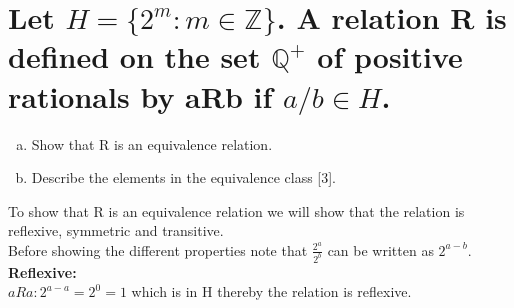 \newpage
\section{Let $H = \{2^m : m\in \mathbb{Z}\}$. A relation R is defined on the set $\mathbb{Q}^{+}$ of positive rationals by aRb if $a/b\in H$.}
\begin{enumerate}[a.]
\item Show that R is an equivalence relation.
\item Describe the elements in the equivalence class [3].
\end{enumerate}
To show that R is an equivalence relation we will show that the relation is reflexive, symmetric and transitive.\\
Before showing the different properties note that $\frac{2^a}{2^b}$ can be written as $2^{a-b}$.\\
\textbf{Reflexive:}\\
$aRa: 2^{a-a}=2^0=1$ which is in H thereby the relation is reflexive.\\
\textbf{}
\newpage
